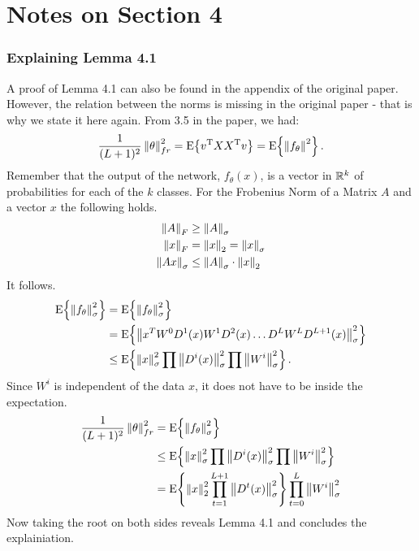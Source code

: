 \newpage
\section{Notes on Section 4}

\subsubsection{Explaining Lemma 4.1}

A proof of Lemma 4.1 can also be found in the appendix of the original paper. However,
the relation between the norms is missing in the original paper - that is why we state it here again.
From 3.5 in the paper, we had:
\begin{align}
	\frac{1}{(L+1)^2} \left\lVert\theta\right\rVert_{fr}^{2} = \mathrm{E}\!\left\{{v^{\mathrm{T}} X X^{\mathrm{T}} v}\right\} = \mathrm{E}\!\left\{{\left\lVert f_\theta\right\rVert^2}\right\}.
\end{align}
Remember that the output of the network, $f_\theta(x)$, is a vector in $\mathbb{R}^k$ of probabilities for each of the $k$ classes.  
For the Frobenius Norm of a Matrix $A$ and a vector $x$ the following holds.
\begin{align}
	\left\lVert A\right\rVert_{ F } &\geq \left\lVert A\right\rVert_{ \sigma } \\
	\left\lVert x\right\rVert_{ F } &= \left\lVert x\right\rVert_{ 2 } = \left\lVert x\right\rVert_{ \sigma } \\
	\left\lVert Ax\right\rVert_{ \sigma } &\leq \left\lVert A\right\rVert_{ \sigma } \cdot \left\lVert x\right\rVert_{ 2 } \\
\end{align}
It follows.
\begin{align}
	\mathrm{E}\!\left\{{\left\lVert f_\theta\right\rVert_{ \sigma }^2}\right\}
	&= 
		\mathrm{E}\!\left\{{ \left\lVert f_\theta\right\rVert_{ \sigma }^2}\right\} \\
	&= 
		\mathrm{E}\!\left\{{ \left\lVert{ x^T W^0 D^1(x) W^1 D^2(x) \dots D^L W^L D^{L+1}(x) }\right\rVert_{ \sigma }^{2} }\right\} \\
	&\leq 
		\mathrm{E}\!\left\{{ \left\lVert x\right\rVert_{ \sigma }^2 \prod \left\lVert D^i(x)\right\rVert_{ \sigma }^2 \prod \left\lVert W^i\right\rVert_{ \sigma }^2 }\right\}.
\end{align}
Since $W^i$ is independent of the data $x$, it does not have to be inside the expectation.
\begin{align}
\frac{1}{(L+1)^2} \left\lVert\theta\right\rVert_{ fr }^2
	&=
		\mathrm{E}\!\left\{{\left\lVert f_\theta\right\rVert_{ \sigma }^2}\right\}  \\	
	&\leq 
		\mathrm{E}\!\left\{{ \left\lVert x\right\rVert_{ \sigma }^2 \prod \left\lVert D^i(x)\right\rVert_{ \sigma }^2 \prod \left\lVert W^i\right\rVert_{ \sigma }^2 }\right\} \\
	&=
		\mathrm{E}\!\left\{{ \left\lVert x\right\rVert_{ 2 }^2 \prod_{t=1}^{L+1} \left\lVert D^t(x)\right\rVert_{ \sigma }^2 }\right\} \prod_{t=0}^{L} \left\lVert W^i\right\rVert_{ \sigma }^2
\end{align}
Now taking the root on both sides reveals Lemma 4.1 and concludes the explainiation.






